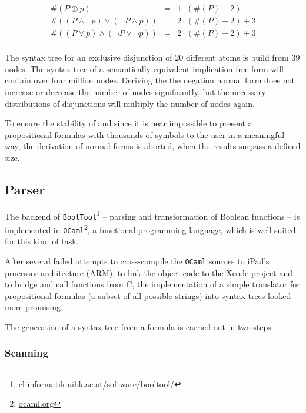 \begin{eqnarray*}
\#(P \oplus p) & = & 1 \cdot(\#(P) + 2) \\
\#((P \wedge \neg p) \vee  (\neg P \wedge p)) & = & 2 \cdot (\#(P) + 2) + 3 \\
\#((P \vee p) \wedge  (\neg P \vee \neg p)) & = & 2 \cdot (\#(P) + 2) + 3 \\
\end{eqnarray*}

The syntax tree for an exclusive disjunction of 20 different atoms is build from 39 nodes.
The syntax tree of a semantically equivalent implication free form will contain over four million nodes.
Deriving the the negation normal form does not increase or decrease the number of nodes significantly,
but the necessary distributions of disjunctions will multiply the number of nodes again.

To ensure the stability of \Nyaya 
and since it is near impossible 
to present a propositional formulas with thousands of symbols 
to the user in a meaningful way, 
the derivation of normal forms is aborted, when the results surpass a defined size.



\subsection{Parser}
\label{subsec:Parser}

The backend of \verb+BoolTool+\footnote{
\href{http://cl-informatik.uibk.ac.at/software/booltool/}{cl-informatik.uibk.ac.at/software/booltool/}} 
– parsing and transformation of Boolean functions – 
is implemented in \verb+OCaml+\footnote{
\href{http://ocaml.org}{ocaml.org}}, 
a functional programming language, which is well suited for this kind of task.

After several failed attempts to cross-compile the \verb+OCaml+ sources to iPad's processor architecture (ARM),
to link the object code to the Xcode project and to bridge and call functions from C, 
the implementation of a simple translator 
for propositional formulas (a subset of all possible strings)
into syntax trees looked more promising. 

The generation of a syntax tree from a formula  is carried out in two steps. 

\subsubsection{Scanning}


